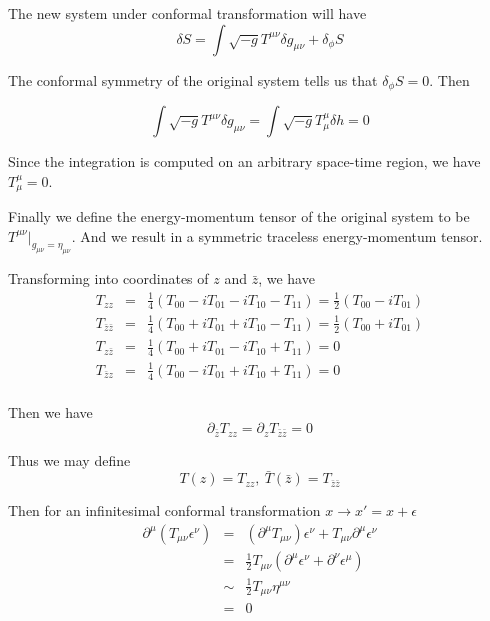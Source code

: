 \documentclass[12pt]{book}
\begin{document}
	The new system under conformal transformation will have
	\begin{equation}
		\delta S=\int \sqrt{-g}T^{\mu\nu}\delta g_{\mu\nu}+\delta_{\phi}S
	\end{equation}
	
	The conformal symmetry of the original system tells us that $\delta_{\phi}S=0$. Then
	
	\begin{equation}
		\int \sqrt{-g}T^{\mu\nu}\delta g_{\mu\nu}=\int \sqrt{-g}T^\mu_\mu\delta h=0
	\end{equation}
	
	Since the integration is computed on an arbitrary space-time region, we have $T^\mu_\mu=0$.
	
	Finally we define the energy-momentum tensor of the original system to be $T^{\mu\nu}|_{g_{\mu\nu}=\eta_{\mu\nu}}$. And we result in a symmetric traceless energy-momentum tensor.
	
	Transforming into coordinates of $z$ and $\bar z$, we have
	\begin{eqnarray}
		T_{zz}&=&\frac 14(T_{00}-iT_{01}-iT_{10}-T_{11})=\frac 12(T_{00}-iT_{01})\\
		T_{\bar z\bar z}&=&\frac 14(T_{00}+iT_{01}+iT_{10}-T_{11})=\frac 12(T_{00}+iT_{01})\\
		T_{z\bar z}&=&\frac 14(T_{00}+iT_{01}-iT_{10}+T_{11})=0\\
		T_{\bar zz}&=&\frac 14(T_{00}-iT_{01}+iT_{10}+T_{11})=0\\
	\end{eqnarray}
	
	Then we have
	\begin{equation}
		\partial_{\bar z}T_{zz}=\partial_z T_{\bar z\bar z}=0
	\end{equation}
	
	Thus we may define
	\begin{equation}
		T(z)=T_{zz},\  \bar T(\bar z)=T_{\bar z\bar z}
	\end{equation}
	
	Then for an infinitesimal conformal transformation $x\rightarrow x'=x+\epsilon$
	\begin{eqnarray}
		\partial^\mu(T_{\mu\nu}\epsilon^\nu)&=&(\partial^\mu T_{\mu\nu})\epsilon^\nu+T_{\mu\nu}\partial^\mu \epsilon^\nu\\
		&=&\frac 12T_{\mu\nu}(\partial^\mu \epsilon^\nu+\partial^\nu \epsilon^\mu)\\
		&\sim&\frac 12T_{\mu\nu}\eta^{\mu\nu}\\
		&=&0
	\end{eqnarray}
	
\end{document}
